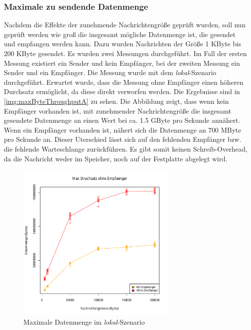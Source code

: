 \subsubsection{Maximale zu sendende Datenmenge}
\label{sec:maxthroughput}
Nachdem die Effekte der zunehmende Nachrichtengröße geprüft wurden, soll nun geprüft werden wie groß die insgesamt mögliche Datenmenge ist, die gesendet und empfangen werden kann. Dazu wurden Nachrichten der Größe 1 KByte bis 200 KByte gesendet. Es wurden zwei Messungen durchgeführt. Im Fall der ersten Messung existiert ein Sender und kein Empfänger, bei der zweiten Messung ein Sender und ein Empfänger. Die Messung wurde mit dem \textit{lokal}-Szenario durchgeführt. Erwartet wurde, dass die Messung ohne Empfänger einen höheren Durchsatz ermöglicht, da diese direkt verworfen werden. 
Die Ergebnisse sind in \autoref{img:maxByteThroughputA} zu sehen. Die Abbildung zeigt, dass wenn kein Empfänger vorhanden ist, mit zunehmender Nachrichtengröße die insgesamt gesendete Datenmenge an einen Wert bei ca. 1.5 GByte pro Sekunde annähert. Wenn ein Empfänger vorhanden ist, nähert sich die Datenmenge an 700 MByte pro Sekunde an. Dieser Uterschied lässt sich auf den fehlenden Empfänger bzw. die fehlende Warteschlange zurückführen. Es gibt somit keinen Schreib-Overhead, da die Nachricht weder im Speicher, noch auf der Festplatte abgelegt wird.
\begin{figure}
\center
  \includegraphics[width=0.7\textwidth]{images/measurement/rate-limit-unlimited-consumer-vs-no-consumer.pdf}
  \caption{Maximale Datenmenge im \textit{lokal}-Szenario}
  \label{img:maxByteThroughputA}
\end{figure}

